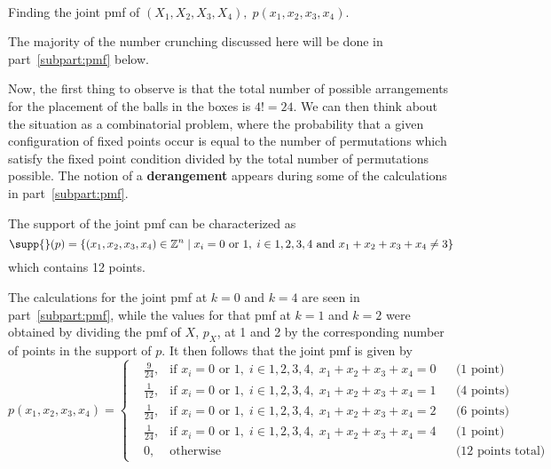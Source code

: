 \documentclass{mthe353answer}
\begin{document}
  \begin{questions}
    \setcounter{question}{2}
    \question{}\
    \begin{subparts}

      \subpart{}
      Finding the joint pmf of \((X_1, X_2, X_3, X_4),\; p(x_1, x_2, x_3, x_4)\).

      \begin{note}
        The majority of the number crunching discussed here will be done in
        part~\ref{subpart:pmf} below.
      \end{note}
      Now, the first thing to observe is that the total number of possible
      arrangements for the placement of the balls in the boxes is \(4! = 24\).
      We can then think about the situation as a combinatorial problem, where
      the probability that a given configuration of fixed points occur is equal
      to the number of permutations which satisfy the fixed point condition
      divided by the total number of permutations possible. The notion of a
      \textbf{derangement} appears during some of the calculations in
      part~\ref{subpart:pmf}.

      The support of the joint pmf can be characterized as
      \begin{equation*}
        \supp{} (p) = \{(x_1, x_2, x_3, x_4) \in \mathbb{Z}^n \mid x_i = 0 \text{ or } 1,\; i \in {1, 2, 3, 4} \text{ and } x_1 + x_2 + x_3 + x_4 \neq 3\}
      \end{equation*}
      which contains 12 points.

      The calculations for the joint pmf at \(k = 0\) and \(k = 4\) are seen in part~\ref{subpart:pmf},
      while the values for that pmf at \(k = 1\) and \(k = 2\) were obtained by
      dividing the pmf of \(X\), \(p_X\), at 1 and 2 by the corresponding number of points
      in the support of \(p\). It then follows that the joint pmf is given by
      \begin{equation*}
        \boxed{
          p(x_1, x_2, x_3, x_4) = \left\{
          \begin{aligned}
            &\frac{9}{24}, & \text{if } x_i = 0 \text{ or } 1,\; i \in {1, 2, 3, 4},\; x_1 + x_2 + x_3 + x_4 = 0 && \text{(1 point)}\\
            &\frac{1}{12}, & \text{if } x_i = 0 \text{ or } 1,\; i \in {1, 2, 3, 4},\; x_1 + x_2 + x_3 + x_4 = 1 && \text{(4 points)}\\
            &\frac{1}{24}, & \text{if } x_i = 0 \text{ or } 1,\; i \in {1, 2, 3, 4},\; x_1 + x_2 + x_3 + x_4 = 2 && \text{(6 points)}\\
            &\frac{1}{24}, & \text{if } x_i = 0 \text{ or } 1,\; i \in {1, 2, 3, 4},\; x_1 + x_2 + x_3 + x_4 = 4 && \text{(1 point)}\\
            &0,            & \text{otherwise}                     && \text{(12 points total)}
          \end{aligned}
          \right.
        }
      \end{equation*}


\end{subparts}
\end{questions}
\end{document}
